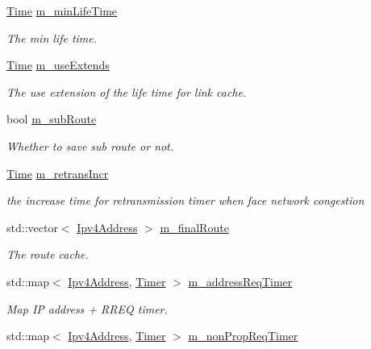 \begin{DoxyCompactItemize}
\hyperlink{classns3_1_1Time}{Time} \hyperlink{classns3_1_1dsr_1_1DsrRouting_ad7daf5388ab1104e535b27bb4eae1421}{m\+\_\+min\+Life\+Time}
\begin{DoxyCompactList}\small\item\em The min life time. \end{DoxyCompactList}\item 
\hyperlink{classns3_1_1Time}{Time} \hyperlink{classns3_1_1dsr_1_1DsrRouting_aa0a73bc163b0b32c84a5913ebbb62dc5}{m\+\_\+use\+Extends}
\begin{DoxyCompactList}\small\item\em The use extension of the life time for link cache. \end{DoxyCompactList}\item 
bool \hyperlink{classns3_1_1dsr_1_1DsrRouting_a83f7a7d54f8b078d987d46cf6edcd08e}{m\+\_\+sub\+Route}
\begin{DoxyCompactList}\small\item\em Whether to save sub route or not. \end{DoxyCompactList}\item 
\hyperlink{classns3_1_1Time}{Time} \hyperlink{classns3_1_1dsr_1_1DsrRouting_a49d8f2c59b9e8bcd6cb57cb302eac47b}{m\+\_\+retrans\+Incr}
\begin{DoxyCompactList}\small\item\em the increase time for retransmission timer when face network congestion \end{DoxyCompactList}\item 
std\+::vector$<$ \hyperlink{classns3_1_1Ipv4Address}{Ipv4\+Address} $>$ \hyperlink{classns3_1_1dsr_1_1DsrRouting_afb085eaa8fcab547a83f683ef5aef41a}{m\+\_\+final\+Route}
\begin{DoxyCompactList}\small\item\em The route cache. \end{DoxyCompactList}\item 
std\+::map$<$ \hyperlink{classns3_1_1Ipv4Address}{Ipv4\+Address}, \hyperlink{classns3_1_1Timer}{Timer} $>$ \hyperlink{classns3_1_1dsr_1_1DsrRouting_a47174823b0622573b681afc40d6ea558}{m\+\_\+address\+Req\+Timer}
\begin{DoxyCompactList}\small\item\em Map IP address + R\+R\+EQ timer. \end{DoxyCompactList}\item 
std\+::map$<$ \hyperlink{classns3_1_1Ipv4Address}{Ipv4\+Address}, \hyperlink{classns3_1_1Timer}{Timer} $>$ \hyperlink{classns3_1_1dsr_1_1DsrRouting_a0936df610f90f7e79c24a2a8cdea6c14}{m\+\_\+non\+Prop\+Req\+Timer}

\end{DoxyCompactItemize}
